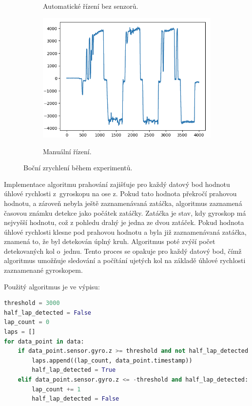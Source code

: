 \begin{figure}[!h]
\begin{subfigure}{.5\textwidth}
        \label{fig:LapsAuto}
        \caption{Automatické řízení bez senzorů.}
    \end{subfigure}
    \begin{subfigure}{.5\textwidth}
        \includegraphics[width = \textwidth]{Figures/LapManual.png}
        \label{fig:LapsManual}
        \caption{Manuální řízení.}
    \end{subfigure}
    \captionsetup{justification=centering}
    \caption{Boční zrychlení během experimentů.}
    \label{fig:Laps}
\end{figure}

Implementace algoritmu prahování zajišťuje pro každý datový bod hodnotu úhlové
rychlosti z~gyroskopu na ose z. Pokud tato hodnota překročí prahovou hodnotu,
a zároveň nebyla ještě zaznamenávaná zatáčka, algoritmus zaznamená časovou známku 
detekce jako počátek zatáčky. Zatáčka je stav, kdy gyroskop má nejvyšší hodnotu, 
což z pohledu drahý je jedna ze dvou zatáček. Pokud hodnota úhlové rychlosti klesne 
pod prahovou hodnotu a byla již zaznamenávaná zatáčka, znamená to, že byl detekován 
úplný kruh. Algoritmus poté zvýší počet detekovaných kol o~jednu. Tento proces se 
opakuje pro každý datový bod, čímž algoritmus umožňuje sledování a počítání ujetých 
kol na základě úhlové rychlosti zaznamenané gyroskopem. 

Použitý algoritmus je ve výpisu:

\begin{lstlisting}[language = python, caption = Počet kol, label = lst:countLap]
threshold = 3000
half_lap_detected = False
lap_count = 0
laps = []
for data_point in data:
    if data_point.sensor.gyro.z >= threshold and not half_lap_detected:
        laps.append((lap_count, data_point.timestamp))
        half_lap_detected = True
    elif data_point.sensor.gyro.z <= -threshold and half_lap_detected:
        lap_count += 1
        half_lap_detected = False
\end{lstlisting}

